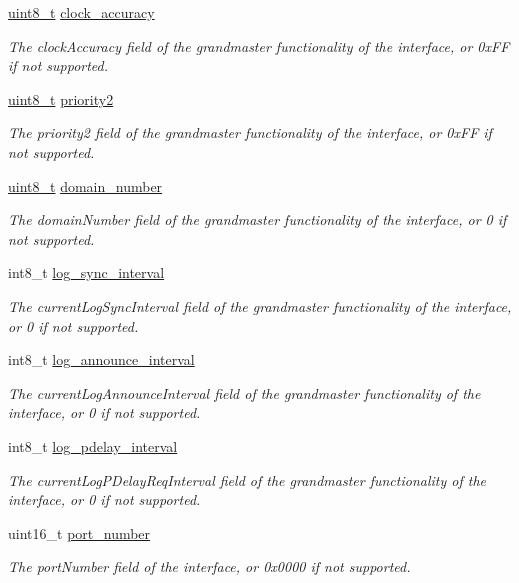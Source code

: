 \begin{DoxyCompactItemize}
\hyperlink{stdint_8h_aba7bc1797add20fe3efdf37ced1182c5}{uint8\+\_\+t} \hyperlink{class_offset_a708d6d971b6be997cf8d3e683951ceb0}{clock\+\_\+accuracy}
\begin{DoxyCompactList}\small\item\em The clock\+Accuracy field of the grandmaster functionality of the interface, or 0x\+FF if not supported. \end{DoxyCompactList}\item 
\hyperlink{stdint_8h_aba7bc1797add20fe3efdf37ced1182c5}{uint8\+\_\+t} \hyperlink{class_offset_ac04b889463a96b43985cb82020e3c39b}{priority2}
\begin{DoxyCompactList}\small\item\em The priority2 field of the grandmaster functionality of the interface, or 0x\+FF if not supported. \end{DoxyCompactList}\item 
\hyperlink{stdint_8h_aba7bc1797add20fe3efdf37ced1182c5}{uint8\+\_\+t} \hyperlink{class_offset_a96702548f5b9222af26319c695764b29}{domain\+\_\+number}
\begin{DoxyCompactList}\small\item\em The domain\+Number field of the grandmaster functionality of the interface, or 0 if not supported. \end{DoxyCompactList}\item 
int8\+\_\+t \hyperlink{class_offset_a2d4950b4c6da4dfa67688dcaf6139c9d}{log\+\_\+sync\+\_\+interval}
\begin{DoxyCompactList}\small\item\em The current\+Log\+Sync\+Interval field of the grandmaster functionality of the interface, or 0 if not supported. \end{DoxyCompactList}\item 
int8\+\_\+t \hyperlink{class_offset_a15bb50a04ecd3ec11563012afc7e24a7}{log\+\_\+announce\+\_\+interval}
\begin{DoxyCompactList}\small\item\em The current\+Log\+Announce\+Interval field of the grandmaster functionality of the interface, or 0 if not supported. \end{DoxyCompactList}\item 
int8\+\_\+t \hyperlink{class_offset_a26544b553c0b251da8e632533f260a5d}{log\+\_\+pdelay\+\_\+interval}
\begin{DoxyCompactList}\small\item\em The current\+Log\+P\+Delay\+Req\+Interval field of the grandmaster functionality of the interface, or 0 if not supported. \end{DoxyCompactList}\item 
uint16\+\_\+t \hyperlink{class_offset_af0afa7bb85d49ac5ff873fad86a48ec5}{port\+\_\+number}
\begin{DoxyCompactList}\small\item\em The port\+Number field of the interface, or 0x0000 if not supported. \end{DoxyCompactList}\end{DoxyCompactItemize}


